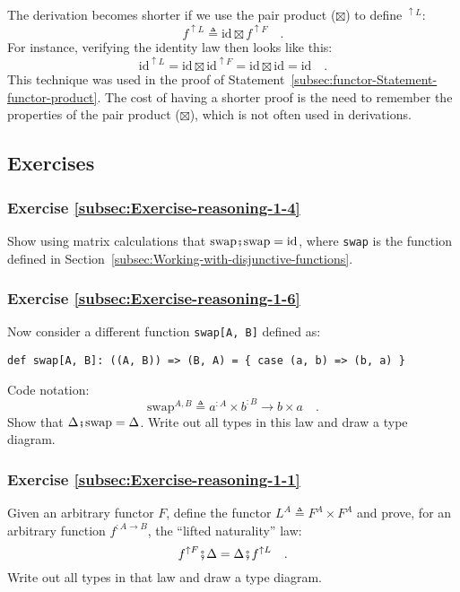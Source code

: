 The derivation becomes shorter if we use the pair product ($\boxtimes$)
to define $^{\uparrow L}$:
\[
f^{\uparrow L}\triangleq\text{id}\boxtimes f^{\uparrow F}\quad.
\]
For instance, verifying the identity law then looks like this:
\[
\text{id}^{\uparrow L}=\text{id}\boxtimes\text{id}^{\uparrow F}=\text{id}\boxtimes\text{id}=\text{id}\quad.
\]
This technique was used in the proof of Statement~\ref{subsec:functor-Statement-functor-product}.
The cost of having a shorter proof is the need to remember the properties
of the pair product ($\boxtimes$), which is not often used in derivations.

\subsection{Exercises}

\subsubsection{Exercise \label{subsec:Exercise-reasoning-1-4}\ref{subsec:Exercise-reasoning-1-4}}

Show using matrix calculations that $\text{swap}\bef\text{swap}=\text{id}$,
where \lstinline!swap! is the function defined in Section~\ref{subsec:Working-with-disjunctive-functions}.

\subsubsection{Exercise \label{subsec:Exercise-reasoning-1-6}\ref{subsec:Exercise-reasoning-1-6}}

Now consider a different function \lstinline!swap[A, B]! defined
as:
\begin{lstlisting}
def swap[A, B]: ((A, B)) => (B, A) = { case (a, b) => (b, a) }
\end{lstlisting}
Code notation:
\[
\text{swap}^{A,B}\triangleq a^{:A}\times b^{:B}\rightarrow b\times a\quad.
\]
Show that $\Delta\bef\text{swap}=\Delta$. Write out all types in
this law and draw a type diagram.

\subsubsection{Exercise \label{subsec:Exercise-reasoning-1-1}\ref{subsec:Exercise-reasoning-1-1}}

Given an arbitrary functor $F$, define the functor $L^{A}\triangleq F^{A}\times F^{A}$
and prove, for an arbitrary function $f^{:A\rightarrow B}$, the \textsf{``}lifted
naturality\textsf{''} law:
\[
f^{\uparrow F}\bef\Delta=\Delta\bef f^{\uparrow L}\quad.
\]
Write out all types in that law and draw a type diagram.

